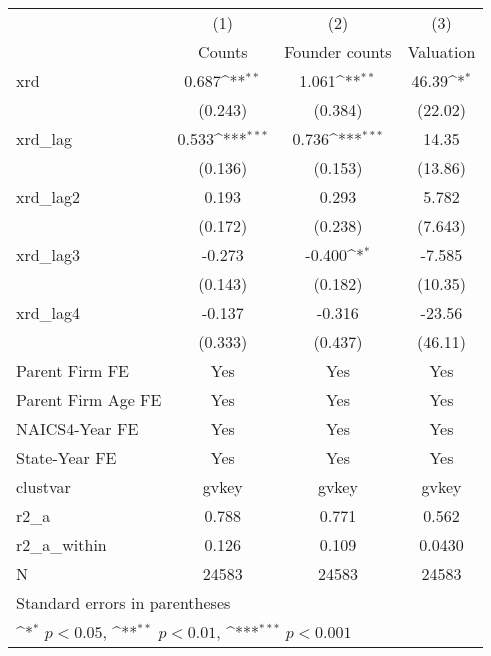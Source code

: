 {
\def\sym#1{\ifmmode^{#1}\else\(^{#1}\)\fi}
\begin{tabular}{l*{3}{c}}
\hline\hline
            &\multicolumn{1}{c}{(1)}&\multicolumn{1}{c}{(2)}&\multicolumn{1}{c}{(3)}\\
            &\multicolumn{1}{c}{Counts}&\multicolumn{1}{c}{Founder counts}&\multicolumn{1}{c}{Valuation}\\
\hline
xrd         &       0.687\sym{**} &       1.061\sym{**} &       46.39\sym{*}  \\
            &     (0.243)         &     (0.384)         &     (22.02)         \\
[1em]
xrd\_lag     &       0.533\sym{***}&       0.736\sym{***}&       14.35         \\
            &     (0.136)         &     (0.153)         &     (13.86)         \\
[1em]
xrd\_lag2    &       0.193         &       0.293         &       5.782         \\
            &     (0.172)         &     (0.238)         &     (7.643)         \\
[1em]
xrd\_lag3    &      -0.273         &      -0.400\sym{*}  &      -7.585         \\
            &     (0.143)         &     (0.182)         &     (10.35)         \\
[1em]
xrd\_lag4    &      -0.137         &      -0.316         &      -23.56         \\
            &     (0.333)         &     (0.437)         &     (46.11)         \\
[1em]
Parent Firm FE&         Yes         &         Yes         &         Yes         \\
[1em]
Parent Firm Age FE&         Yes         &         Yes         &         Yes         \\
[1em]
NAICS4-Year FE&         Yes         &         Yes         &         Yes         \\
[1em]
State-Year FE&         Yes         &         Yes         &         Yes         \\
\hline
clustvar    &       gvkey         &       gvkey         &       gvkey         \\
r2\_a        &       0.788         &       0.771         &       0.562         \\
r2\_a\_within &       0.126         &       0.109         &      0.0430         \\
N           &       24583         &       24583         &       24583         \\
\hline\hline
\multicolumn{4}{l}{\footnotesize Standard errors in parentheses}\\
\multicolumn{4}{l}{\footnotesize \sym{*} \(p<0.05\), \sym{**} \(p<0.01\), \sym{***} \(p<0.001\)}\\
\end{tabular}
}
